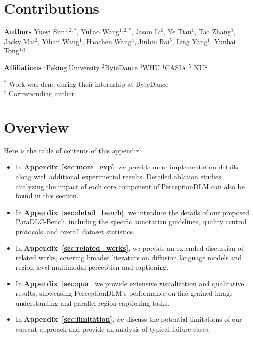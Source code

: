 \documentclass{llmxive}
\providecommand{\beginappendix}{\appendix{\titlefont\sffamily \seedblue{Appendix}\par}}
\begin{document}
% 
\section{Contributions}
\label{sec:contribution}

\textbf{Authors} Yueyi Sun$^{1,2,*}$, Yuhao Wang$^{1,2,*}$, Jason Li$^{2}$, Ye Tian$^{1}$, Tao Zhang$^{3}$, Jacky Mai$^{2}$, Yihan Wang$^{1}$, Haochen Wang$^{4}$, Jinbin Bai$^{5}$, Ling Yang$^{1}$, Yunhai Tong$^{1,\dagger}$

\vspace{2mm}

\textbf{Affiliations} $^{1}$Peking University \quad $^{2}$ByteDance \quad $^{3}$WHU \quad $^{4}$CASIA \quad $^{5}$ NUS

\vspace{2mm}

$^{*}$ Work was done during their internship at ByteDance\\
$^{\dagger}$ Corresponding author







\beginappendix
\tableofcontents



\section{Overview}\vspace{-5pt}

Here is the table of contents of this appendix:

\begin{itemize}
    \item In \textbf{Appendix~\ref{sec:more_exp}}, we provide more implementation details along with additional experimental results. Detailed ablation studies analyzing the impact of each core component of PerceptionDLM can also be found in this section.
    \item In \textbf{Appendix~\ref{sec:detail_bench}}, we introduce the details of our proposed ParaDLC-Bench, including the specific annotation guidelines, quality control protocols, and overall dataset statistics.
    \item In \textbf{Appendix~\ref{sec:related_works}}, we provide an extended discussion of related works, covering broader literature on diffusion language models and region-level multimodal perception and captioning.
    \item In \textbf{Appendix~\ref{sec:qua}}, we provide extensive visualization and qualitative results, showcasing PerceptionDLM's performance on fine-grained image understanding and parallel region captioning tasks.
    \item In \textbf{Appendix~\ref{sec:limitation}}, we discuss the potential limitations of our current approach and provide an analysis of typical failure cases.
\end{itemize}
\end{document}
